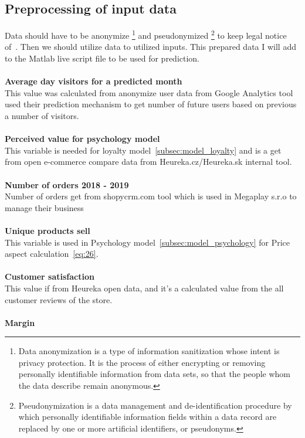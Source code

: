 \subsection{Preprocessing of input data} \label{subsec:preprocessing}
Data should have to be anonymize \footnote{Data anonymization is a type of information sanitization whose intent is privacy protection.
It is the process of either encrypting or removing personally identifiable information from data sets, so that
the people whom the data describe remain anonymous.} and pseudonymized \footnote{Pseudonymization is a data management
and de-identification procedure by which personally identifiable information fields within a data record are replaced
by one or more artificial identifiers, or pseudonyms.} to keep legal notice of~\cite{gdpr}.
Then we should utilize data to utilized inputs.
This prepared data I will add to the Matlab live script file to be used for prediction.\\
\\
\textbf{Average day visitors for a predicted month}\\
This value was calculated from anonymize user data from Google Analytics tool used their prediction mechanism to get number of future users based on previous a number of visitors.\\
\\
\textbf{Perceived value for psychology model} \label{perceived}\\
This variable is needed for loyalty model~\ref{subsec:model_loyalty} and is a get from open e-commerce compare data from Heureka.cz/Heureka.sk internal tool.\\
\\
\textbf{Number of orders 2018 - 2019}\\
Number of orders get from shopycrm.com tool which is used in Megaplay s.r.o to manage their business\\
\\
\textbf{Unique products sell}\\
This variable is used in Psychology model~\ref{subsec:model_psychology} for Price aspect calculation~\ref{eq:26}.\\
\\
\textbf{Customer satisfaction} \label{customerSat}\\
This value if from Heureka open data, and it's a calculated value from the all customer reviews of the store.\\
\\
\textbf{Margin}\\
